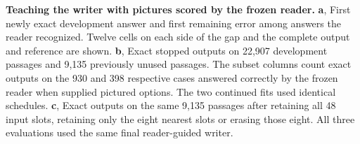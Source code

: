 \textbf{Teaching the writer with pictures scored by the frozen reader.}
\textbf{a}, First newly exact development answer and first remaining error among answers the reader recognized. Twelve cells on each side of the gap and the complete output and reference are shown.
\textbf{b}, Exact stopped outputs on 22,907 development passages and 9,135 previously unused passages. The subset columns count exact outputs on the 930 and 398 respective cases answered correctly by the frozen reader when supplied pictured options. The two continued fits used identical schedules.
\textbf{c}, Exact outputs on the same 9,135 passages after retaining all 48 input slots, retaining only the eight nearest slots or erasing those eight. All three evaluations used the same final reader-guided writer.
